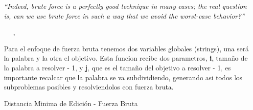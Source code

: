 \epigraph{\textit{``Indeed, brute force is a perfectly good technique in many cases; the real question is, can we use brute force in such a way that we avoid the worst-case behavior?''}}{--- \citeauthor{taocv3}, \citeyear{taocv3} \cite{taocv3}}

Para el enfoque de fuerza bruta tenemos dos variables globales (strings), una será la palabra y la otra el objetivo. Esta funcion recibe dos parametros, \textbf{i}, tamaño de la palabra a resolver - 1, y \textbf{j}, que es el tamaño del objetivo a resolver - 1, es importante recalcar que la palabra se va subdividiendo, generando asi todos los subproblemas posibles y resolviendolos con fuerza bruta.

\begin{algorithm}[H]
    
    \DontPrintSemicolon
    \footnotesize

    \;


    \caption{Distancia Minima de Edición - Fuerza Bruta}
    \label{alg:mi_algoritmo_1}
\end{algorithm}


